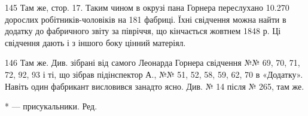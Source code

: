 145    Там же, стор. 17. Таким чином в окрузі пана Горнера переслухано
10.270 дорослих робітників-чоловіків на 181 фабриці. Їхні свідчення
можна найти в додатку до фабричного звіту за півріччя, що кінчається
жовтнем 1848 р. Ці свідчення дають і з іншого боку цінний матеріял.

146    Там же. Див. зібрані від самого Леонарда Горнера свідчення
№№ 69, 70, 71, 72, 92, 93 і ті, що зібрав підінспектор А., №№ 51, 52,
58, 59, 62, 70 в «Додатку». Навіть один фабрикант висловився занадто
ясно. Див. № 14 після № 265, там же.

* — присукальники. Ред.
